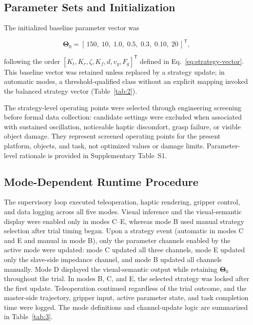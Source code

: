 \subsection{Parameter Sets and Initialization}
The initialized baseline parameter vector was

\begin{equation*}
\boldsymbol{\Theta}_0=[\,150,\;10,\;1.0,\;0.5,\;0.3,\;0.10,\;20\,]^{\mathsf{T}},
\end{equation*}

following the order $[K_t,K_r,\zeta,K_f,d,v_g,F_g]^{\mathsf{T}}$ defined in Eq.~\eqref{eq:strategy-vector}. This baseline vector was retained unless replaced by a strategy update; in automatic modes, a threshold-qualified class without an explicit mapping invoked the balanced strategy vector (Table~\ref{tab:2}).

The strategy-level operating points were selected through engineering screening before formal data collection: candidate settings were excluded when associated with sustained oscillation, noticeable haptic discomfort, grasp failure, or visible object damage. They represent screened operating points for the present platform, objects, and task, not optimized values or damage limits. Parameter-level rationale is provided in Supplementary Table~S1.
\subsection{Mode-Dependent Runtime Procedure}
The supervisory loop executed teleoperation, haptic rendering, gripper control, and data logging across all five modes. Visual inference and the visual-semantic display were enabled only in modes C--E, whereas mode B used manual strategy selection after trial timing began. Upon a strategy event (automatic in modes C and E and manual in mode B), only the parameter channels enabled by the active mode were updated: mode C updated all three channels, mode E updated only the slave-side impedance channel, and mode B updated all channels manually. Mode D displayed the visual-semantic output while retaining $\boldsymbol{\Theta}_0$ throughout the trial. In modes B, C, and E, the selected strategy was locked after the first update. Teleoperation continued regardless of the trial outcome, and the master-side trajectory, gripper input, active parameter state, and task completion time were logged. The mode definitions and channel-update logic are summarized in Table~\ref{tab:3}.
